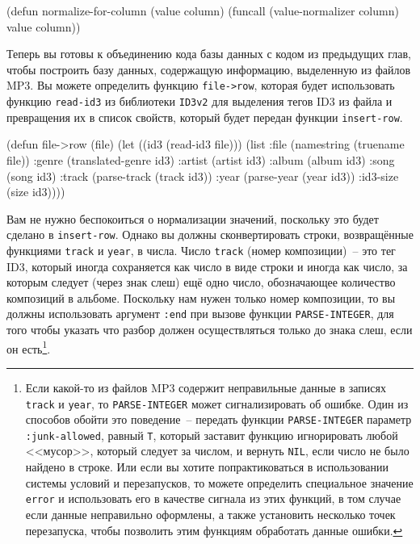 \begin{myverb}
(defun normalize-for-column (value column)
  (funcall (value-normalizer column) value column))
\end{myverb}

Теперь вы готовы к объединению кода базы данных с кодом из предыдущих глав, чтобы
построить базу данных, содержащую информацию, выделенную из файлов MP3.  Вы можете
определить функцию \lstinline{file->row}, которая будет использовать функцию \lstinline{read-id3} из
библиотеки \lstinline{ID3v2} для выделения тегов ID3 из файла и превращения их в список
свойств, который будет передан функции \lstinline{insert-row}.

\begin{myverb}
(defun file->row (file)
  (let ((id3 (read-id3 file)))
    (list
     :file   (namestring (truename file))
     :genre  (translated-genre id3)
     :artist (artist id3)
     :album  (album id3)
     :song   (song id3)
     :track  (parse-track (track id3))
     :year   (parse-year (year id3))
     :id3-size (size id3))))
\end{myverb}

Вам не нужно беспокоиться о нормализации значений, поскольку это будет сделано в
\lstinline{insert-row}.  Однако вы должны сконвертировать строки, возвращённые функциями
\lstinline{track} и \lstinline{year}, в числа.  Число \lstinline{track} (номер композиции)~-- это тег ID3,
который иногда сохраняется как число в виде строки и иногда как число, за которым следует
(через знак слеш) ещё одно число, обозначающее количество композиций в альбоме.  Поскольку
нам нужен только номер композиции, то вы должны использовать аргумент \lstinline{:end} при
вызове функции \lstinline{PARSE-INTEGER}, для того чтобы указать что разбор должен
осуществляться только до знака слеш, если он есть\footnote{Если какой-то из файлов MP3
  содержит неправильные данные в записях \lstinline{track} и \lstinline{year}, то
  \lstinline{PARSE-INTEGER} может сигнализировать об ошибке. Один из способов обойти это
  поведение~-- передать функции \lstinline{PARSE-INTEGER} параметр \lstinline{:junk-allowed}, равный
  \lstinline{T}, который заставит функцию игнорировать любой <<мусор>>, который следует за
  числом, и вернуть \lstinline{NIL}, если число не было найдено в строке.  Или если вы хотите
  попрактиковаться в использовании системы условий и перезапусков, то можете определить
  специальное значение \lstinline{error} и использовать его в качестве сигнала из этих функций,
  в том случае если данные неправильно оформлены, а также установить несколько точек
  перезапуска, чтобы позволить этим функциям обработать данные ошибки.}\hspace{\footnotenegspace}.

